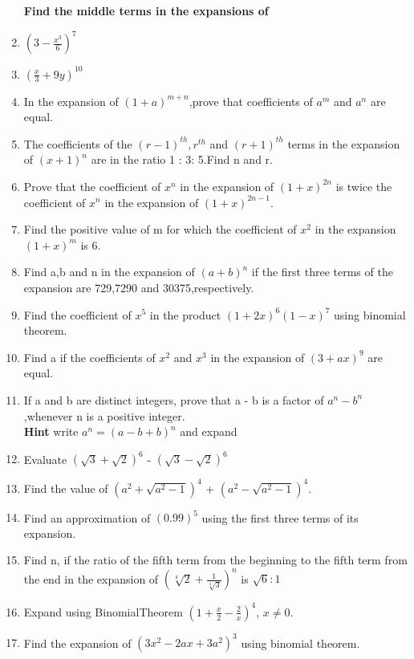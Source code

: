 \begin{enumerate}[label=\arabic*.,ref=\thesubsection.\theenumi]
\textbf{Find the middle terms in the expansions of }\\
\item $(3 - \frac{x^3}{6})^7$\\
\item $(\frac{x}{3} + 9y)^{10}$\\
\item In the expansion of $(1 + a)^{m+n}$,prove that coefficients of $a^m$ and $a^n$ are equal.\\
\item The coefficients of the $(r - 1)^{th},r^{th}$ and $(r + 1)^{th}$ terms in the expansion of $(x + 1)^n$ are in the ratio 1 : 3: 5.Find n and r.\\
\item Prove that the coefficient of $x^n$ in the expansion of $(1 + x)^{2n}$ is twice the coefficient of $x^n$ in the expansion of $(1 + x)^{2n - 1}.$\\
\item Find the positive value of m for which the coefficient of $x^2$ in the expansion $(1 + x)^m$ is 6.\\
\item Find a,b and n in the expansion of $(a + b)^n$ if the first three terms of the expansion are 729,7290 and 30375,respectively.\\
\item Find the coefficient of $x^5$ in the product $(1 + 2x)^6 (1 - x)^7$ using binomial theorem.\\
\item Find a if the coefficients of $x^2$ and $x^3$ in the expansion of $(3 + ax)^9$ are equal.\\
\item If a and b are distinct integers, prove that a - b is a factor of $a^n - b^n$,whenever n is a positive integer.\\
\textbf{Hint} write $a^n = (a - b + b)^n$ and expand\\
\item Evaluate $(\sqrt{3} + \sqrt{2})^6$ - $(\sqrt{3} - \sqrt{2})^6$\\
\item Find the value of $(a^2 + \sqrt{a^2 - 1})^4$ + $(a^2 - \sqrt{a^2 - 1})^4.$\\
\item Find an approximation of $(0.99)^5$ using the first three terms of its expansion.\\
\item Find n, if the ratio of the fifth term from the beginning to the fifth term from the end in the expansion of $(\sqrt[4]{2} + \frac{1}{\sqrt[4]{3}})^n$ is $\sqrt{6} : 1$\\
\item Expand using BinomialTheorem $(1 + \frac{x}{2} - \frac{2}{x})^4$, $x \neq 0.$\\
\item Find the expansion of $(3x^2 - 2ax + 3a^2)^3$ using binomial theorem.




\end{enumerate}
%
